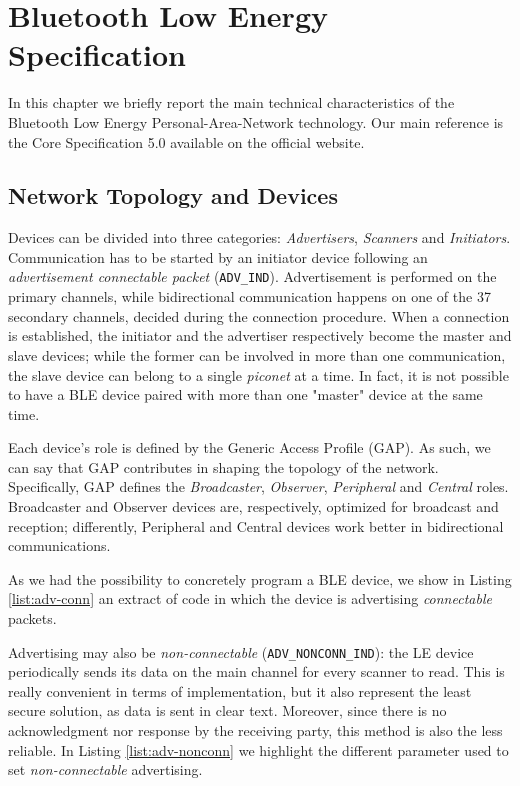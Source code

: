 \chapter{Bluetooth Low Energy Specification}
\label{chapter2}
\thispagestyle{empty}

\noindent In this chapter we briefly report the main technical characteristics of the Bluetooth Low Energy Personal-Area-Network technology. Our main reference is the Core Specification 5.0 available on the official website. 

\section{Network Topology and Devices}
Devices can be divided into three categories: \textit{Advertisers}, \textit{Scanners} and \textit{Initiators}. Communication has to be started by an initiator device following an \textit{advertisement connectable packet} (\texttt{ADV\_IND}). Advertisement is performed on the primary channels, while bidirectional communication happens on one of the 37 secondary channels, decided during the connection procedure. When a connection is established, the initiator and the advertiser respectively become the master and slave devices; while the former can be involved in more than one communication, the slave device can belong to a single \textit{piconet} at a time. In fact, it is not possible to have a BLE device paired with more than one "master" device at the same time.

Each device's role is defined by the Generic Access Profile (GAP). As such, we can say that GAP contributes in shaping the topology of the network. Specifically, GAP defines the \textit{Broadcaster}, \textit{Observer}, \textit{Peripheral} and \textit{Central} roles. Broadcaster and Observer devices are, respectively, optimized for broadcast and reception; differently, Peripheral and Central devices work better in bidirectional communications.

As we had the possibility to concretely program a BLE device, we show in Listing \ref{list:adv-conn} an extract of code in which the device is advertising \textit{connectable} packets.


Advertising may also be \textit{non-connectable} (\texttt{ADV\_NONCONN\_IND}): the LE device periodically sends its data on the main channel for every scanner to read. This is really convenient in terms of implementation, but it also represent the least secure solution, as data is sent in clear text. Moreover, since there is no acknowledgment nor response by the receiving party, this method is also the less reliable. In Listing \ref{list:adv-nonconn} we highlight the different parameter used to set \textit{non-connectable} advertising.


